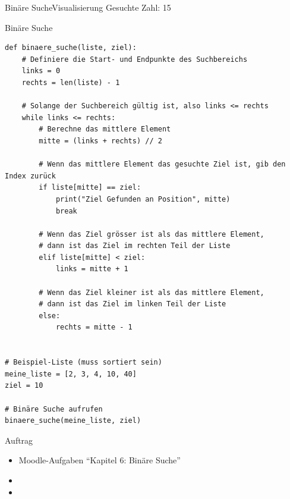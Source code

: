 \begin{frame}[fragile]{Binäre Suche}{Visualisierung}
	Gesuchte Zahl: 15
	\only<1>{
		\begin{figure}[H]
			
			\caption*{Schritt 1}
		\end{figure}
	}


\end{frame}
\begin{frame}[fragile]{Binäre Suche}
	\begin{lstlisting}[basicstyle=\tiny\ttfamily]
def binaere_suche(liste, ziel):
    # Definiere die Start- und Endpunkte des Suchbereichs
    links = 0
    rechts = len(liste) - 1

    # Solange der Suchbereich gültig ist, also links <= rechts
    while links <= rechts:
        # Berechne das mittlere Element
        mitte = (links + rechts) // 2

        # Wenn das mittlere Element das gesuchte Ziel ist, gib den Index zurück
        if liste[mitte] == ziel:
            print("Ziel Gefunden an Position", mitte)
            break

        # Wenn das Ziel grösser ist als das mittlere Element,
        # dann ist das Ziel im rechten Teil der Liste
        elif liste[mitte] < ziel:
            links = mitte + 1

        # Wenn das Ziel kleiner ist als das mittlere Element,
        # dann ist das Ziel im linken Teil der Liste
        else:
            rechts = mitte - 1


# Beispiel-Liste (muss sortiert sein)
meine_liste = [2, 3, 4, 10, 40]
ziel = 10

# Binäre Suche aufrufen
binaere_suche(meine_liste, ziel)
	\end{lstlisting}
\end{frame}

\begin{frame}[fragile]{Auftrag}
	\begin{itemize}
		\item Moodle-Aufgaben \enquote{Kapitel 6: Binäre Suche}
		\item {}
		\item {}
	\end{itemize}
\end{frame}